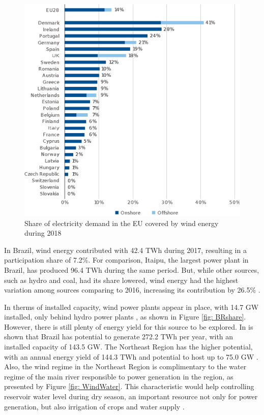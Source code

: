 \begin{figure}[]
	\caption{Share of electricity demand in the EU covered by wind energy during 2018}
	\begin{center}
		\includegraphics[scale=0.65]{Images/EUrank.eps}
	\end{center}
	\label{fig: EUrank}
\end{figure}

In Brazil, wind energy contributed with 42.4 TWh during 2017, resulting in a participation share of 7.2\%. For comparison, Itaipu, the largest power plant in Brazil, has produced 96.4 TWh during the same period. But, while other sources, such as hydro and coal, had its share lowered, wind energy had the highest variation among sources comparing to 2016, increasing its contribution by 26.5\% \cite{EPE2018}. 

In therms of installed capacity, wind power plants appear in  place, with 14.7 GW installed, only behind hydro power plants \cite{ABEEolica2018}, as shown in Figure \ref{fig: BRshare}. However, there is still plenty of energy yield for this source to be explored. In \cite{Atlas2001} is shown that Brazil has potential to generate 272.2 TWh per year, with an installed capacity of 143.5 GW. The Northeast Region has the higher potential, with an annual energy yield of 144.3 TWh and potential to host up to 75.0 GW . Also, the wind regime in the Northeast Region is complimentary to the water regime of the main river responsible to power generation in the region, as presented by Figure \ref{fig: WindWater}. This characteristic would help controlling reservoir water level during dry season, an important resource not only for power generation, but also irrigation of crops and water supply \cite{ANEEL2005}.

